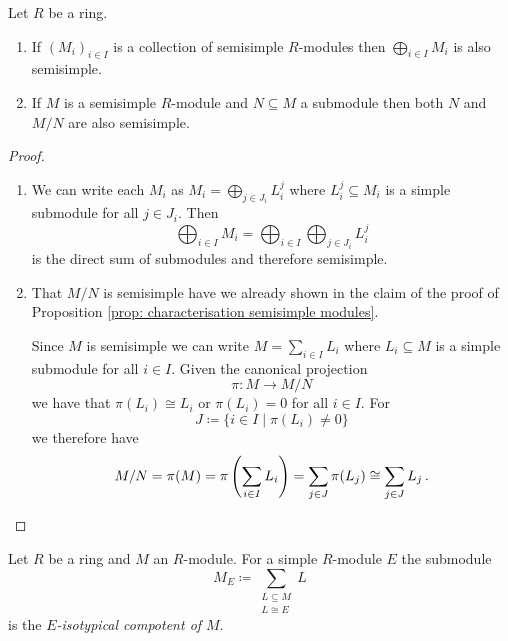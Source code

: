 \begin{lem}\label{lem: inherit semisimple}
  Let $R$ be a ring.
  \begin{enumerate}[label=\emph{\alph*)},leftmargin=*]
    \item
      If $(M_i)_{i \in I}$ is a collection of semisimple $R$-modules then $\bigoplus_{i \in I} M_i$ is also semisimple.
    \item
      If $M$ is a semisimple $R$-module and $N \subseteq M$ a submodule then both $N$ and $M/N$ are also semisimple.
  \end{enumerate}
\end{lem}
\begin{proof}
  \begin{enumerate}[label=\emph{\alph*)},leftmargin=*]
    \item
      We can write each $M_i$ as $M_i = \bigoplus_{j \in J_i} L^j_i$ where $L^j_i \subseteq M_i$ is a simple submodule for all $j \in J_i$.
      Then
      \[
          \bigoplus_{i \in I} M_i
        = \bigoplus_{i \in I} \bigoplus_{j \in J_i} L^j_i
      \]
      is the direct sum of submodules and therefore semisimple.
    \item
      That $M/N$ is semisimple have we already shown in the claim of the proof of Proposition \ref{prop: characterisation semisimple modules}.
      
      Since $M$ is semisimple we can write $M = \sum_{i \in I} L_i$ where $L_i \subseteq M$ is a simple submodule for all $i \in I$.
      Given the canonical projection
      \[
                \pi
        \colon  M
        \to     M / N
      \]
      we have that $\pi(L_i) \cong L_i$ or $\pi(L_i) = 0$ for all $i \in I$.
      For
      \[
                  J
        \coloneqq \{
                    i \in I
                  \mid
                    \pi(L_i) \neq 0
                  \}
      \]
      we therefore have
      \[
              M/N
        =     \pi(M)
        =     \pi\left( \sum_{i \in I} L_i \right)
        =     \sum_{j \in J} \pi(L_j)
        \cong \sum_{j \in J} L_j \,.
        \qedhere
      \]
  \end{enumerate}
\end{proof}


\begin{defi}
  Let $R$ be a ring and $M$ an $R$-module.
  For a simple $R$-module $E$ the submodule
  \[
              M_E
    \coloneqq \sum_{\substack{L \subseteq M \\ L \cong E}} L
  \]
  is the \emph{$E$-isotypical compotent of $M$}.
\end{defi}


